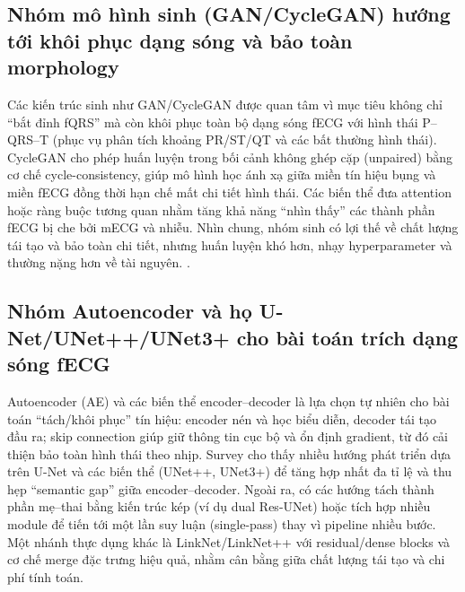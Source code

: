 \documentclass[../DoAn.tex]{subfiles}
\begin{document}
\subsection{Nhóm mô hình sinh (GAN/CycleGAN) hướng tới khôi phục dạng sóng và bảo toàn morphology}
Các kiến trúc sinh như GAN/CycleGAN được quan tâm vì mục tiêu không chỉ “bắt đỉnh fQRS” mà còn khôi phục toàn bộ dạng sóng fECG với hình thái P--QRS--T (phục vụ phân tích khoảng PR/ST/QT và các bất thường hình thái). CycleGAN cho phép huấn luyện trong bối cảnh không ghép cặp (unpaired) bằng cơ chế cycle-consistency, giúp mô hình học ánh xạ giữa miền tín hiệu bụng và miền fECG đồng thời hạn chế mất chi tiết hình thái. Các biến thể đưa attention hoặc ràng buộc tương quan nhằm tăng khả năng “nhìn thấy” các thành phần fECG bị che bởi mECG và nhiễu. Nhìn chung, nhóm sinh có lợi thế về chất lượng tái tạo và bảo toàn chi tiết, nhưng huấn luyện khó hơn, nhạy hyperparameter và thường nặng hơn về tài nguyên. 
\cite{goodfellowGenerativeAdversarialNets2014, zhuUnpairedImageToImageTranslation2017, mohebbianFetalECGExtraction2022, shokouhmandFetalElectrocardiogramExtraction2023}.

\subsection{Nhóm Autoencoder và họ U-Net/UNet++/UNet3+ cho bài toán trích dạng sóng fECG}
Autoencoder (AE) và các biến thể encoder--decoder là lựa chọn tự nhiên cho bài toán “tách/khôi phục” tín hiệu: encoder nén và học biểu diễn, decoder tái tạo đầu ra; skip connection giúp giữ thông tin cục bộ và ổn định gradient, từ đó cải thiện bảo toàn hình thái theo nhịp. Survey cho thấy nhiều hướng phát triển dựa trên U-Net và các biến thể (UNet++, UNet3+) để tăng hợp nhất đa tỉ lệ và thu hẹp “semantic gap” giữa encoder--decoder. Ngoài ra, có các hướng tách thành phần mẹ--thai bằng kiến trúc kép (ví dụ dual Res-UNet) hoặc tích hợp nhiều module để tiến tới một lần suy luận (single-pass) thay vì pipeline nhiều bước. Một nhánh thực dụng khác là LinkNet/LinkNet++ với residual/dense blocks và cơ chế merge đặc trưng hiệu quả, nhằm cân bằng giữa chất lượng tái tạo và chi phí tính toán.
\end{document}
